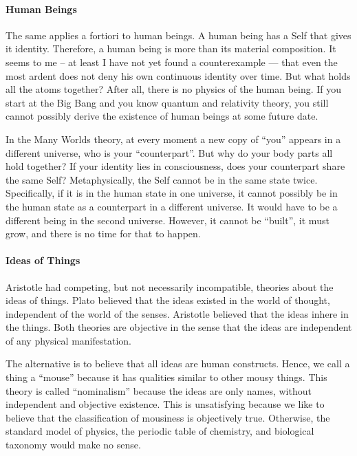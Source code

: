 \paragraph{Human Beings}


The same applies a fortiori to human beings. A human being has a Self that gives it identity. Therefore, a human being is more than its material composition. It seems to me -- at least I have not yet found a counterexample --- that even the most ardent does not deny his own continuous identity over time. But what holds all the atoms together? After all, there is no physics of the human being. If you start at the Big Bang and you know quantum and relativity theory, you still cannot possibly derive the existence of human beings at some future date.

In the Many Worlds theory, at every moment a new copy of ``you'' appears in a different universe, who is your ``counterpart''. But why do your body parts all hold together? If your identity lies in consciousness, does your counterpart share the same Self? Metaphysically, the Self cannot be in the same state twice. Specifically, if it is in the human state in one universe, it cannot possibly be in the human state as a counterpart in a different universe. It would have to be a different being in the second universe. However, it cannot be ``built'', it must grow, and there is no time for that to happen.

\paragraph{Ideas of Things}


Aristotle had competing, but not necessarily incompatible, theories about the ideas of things. Plato believed that the ideas existed in the world of thought, independent of the world of the senses. Aristotle believed that the ideas inhere in the things. Both theories are objective in the sense that the ideas are independent of any physical manifestation.

The alternative is to believe that all ideas are human constructs. Hence, we call a thing a ``mouse'' because it has qualities similar to other mousy things. This theory is called ``nominalism'' because the ideas are only names, without independent and objective existence. This is unsatisfying because we like to believe that the classification of mousiness is objectively true. Otherwise, the standard model of physics, the periodic table of chemistry, and biological taxonomy would make no sense.

